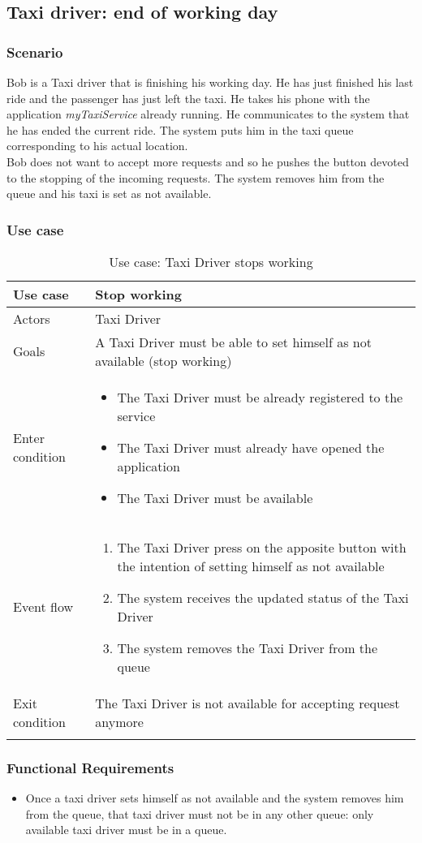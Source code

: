 \subsection{Taxi driver: end of working day}
\subsubsection{Scenario}
Bob is a Taxi driver that is finishing his working day. He has just finished his last ride and the passenger has just left the taxi. He takes his phone with the application \textit{myTaxiService} already running. He communicates to the system that he has ended the current ride. The system puts him in the taxi queue corresponding to his actual location.\\
Bob does not want to accept more requests and so he pushes the button devoted to the stopping of the incoming requests. The system removes him from the queue and his taxi is set as not available.

\subsubsection{Use case}
\begin{center}
\begin{longtable}{| p{} | p{} |} \hline
	Use case & \textbf{Stop working} \\ \hline 
	Actors & Taxi Driver \\ \hline
	Goals & A Taxi Driver must be able to set himself as not available (stop working)  \\ \hline
	Enter condition & \begin{itemize}
						\item The Taxi Driver must be already registered to the service
						\item The Taxi Driver must already have opened the application
						\item The Taxi Driver must be available
						\end{itemize} \\ \hline
	Event flow & \begin{enumerate}
					\item The Taxi Driver press on the apposite button with the intention of setting himself as not available
					\item The system receives the updated status of the Taxi Driver
					\item The system removes the Taxi Driver from the queue
				\end{enumerate} \\ \hline
	Exit condition & The Taxi Driver is not available for accepting request anymore \\ \hline
	\caption{Use case: Taxi Driver stops working}
\end{longtable}
\end{center}

\subsubsection{Functional Requirements}
\begin{itemize}
\item Once a taxi driver sets himself as not available and the system removes him from the queue, that taxi driver must not be in any other queue: only available taxi driver must be in a queue.

\end{itemize}